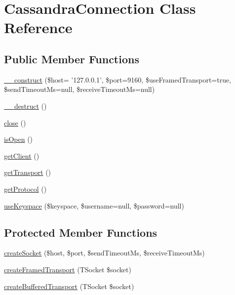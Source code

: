\hypertarget{classCassandraConnection}{
\section{CassandraConnection Class Reference}
\label{classCassandraConnection}
}
\subsection*{Public Member Functions}
\begin{DoxyCompactItemize}
\item 
\hyperlink{classCassandraConnection_a7f75a298bf9fb6362d38f4aeb42ceb28}{\_\-\_\-construct} (\$host= '127.0.0.1', \$port=9160, \$useFramedTransport=true, \$sendTimeoutMs=null, \$receiveTimeoutMs=null)
\item 
\hyperlink{classCassandraConnection_ab491ef3fe8550d70856e708e528cb570}{\_\-\_\-destruct} ()
\item 
\hyperlink{classCassandraConnection_abd8bbd3ef94126f1e6a274b5ad512ece}{close} ()
\item 
\hyperlink{classCassandraConnection_aed004bd39c88a8aea40292f9c5271512}{isOpen} ()
\item 
\hyperlink{classCassandraConnection_a9333243e248f73414e25d5fe143250df}{getClient} ()
\item 
\hyperlink{classCassandraConnection_a7f12a9a108ea4d89083a48bbebdb8a60}{getTransport} ()
\item 
\hyperlink{classCassandraConnection_adb1d52d166f36506ab94605b260e821f}{getProtocol} ()
\item 
\hyperlink{classCassandraConnection_a9bb32ec133d74c18a5ab142a33b96539}{useKeyspace} (\$keyspace, \$username=null, \$password=null)
\end{DoxyCompactItemize}
\subsection*{Protected Member Functions}
\begin{DoxyCompactItemize}
\item 
\hyperlink{classCassandraConnection_a6886c992c6b7cbc24deb801fb8ee52db}{createSocket} (\$host, \$port, \$sendTimeoutMs, \$receiveTimeoutMs)
\item 
\hyperlink{classCassandraConnection_a00c2d10e54028d15cfb5ef8bde3468d3}{createFramedTransport} (TSocket \$socket)
\item 
\hyperlink{classCassandraConnection_a3e3b2e2318ff07ee56bcae235634c2e4}{createBufferedTransport} (TSocket \$socket)
\end{DoxyCompactItemize}
